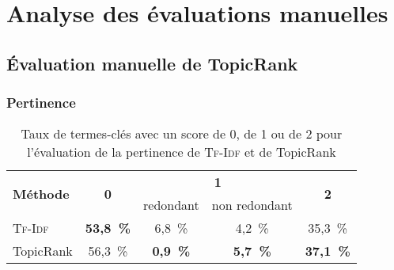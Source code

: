   \section{Analyse des évaluations manuelles}
  \label{sec:main-automatic_evaluation_of_keyphrase_annotation-results}
    
    \subsection{Évaluation manuelle de TopicRank}
    \label{subsec:main-automatic_evaluation_of_keyphrase_annotation-results-topicrank}
    
      \subsubsection{Pertinence}
      \label{subsubsec:main-automatic_evaluation_of_keyphrase_annotation-results-topicrank-pertinence}
      \begin{table}[h!]
          \centering
          \begin{tabular}{l|c|c|c|c}
            \toprule
            \multirow{2}{*}{\textbf{Méthode}} & \multirow{2}{*}{\textbf{0}} & \multicolumn{2}{c|}{\textbf{1}} & \multirow{2}{*}{\textbf{2}}\\
            \cline{3-4}
            & & \multicolumn{1}{p{.175\linewidth}|}{\centering{}redondant} & \multicolumn{1}{p{.175\linewidth}|}{\centering{}non redondant} &\\
            \hline
            \textsc{Tf-Idf} & \textbf{53,8~\%} & 6,8~\% & 4,2~\% & 35,3~\%\\
            TopicRank & 56,3~\% & \textbf{0,9~\%} & \textbf{5,7~\%} & \textbf{37,1~\%}\\
            \bottomrule
          \end{tabular}
          \caption{Taux de termes-clés avec un score de 0, de 1 ou de 2 pour
                   l'évaluation de la pertinence de \textsc{Tf-Idf} et de
                   TopicRank
                   \label{tab:main-automatic_evaluation_of_keyphrase_annotation-results-topicrank-pertinence_score_ratio}}
        \end{table}

